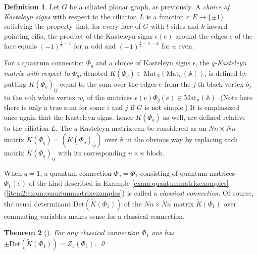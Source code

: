 \documentclass[12pt, reqno]{amsart}
\newtheorem{theo}{Theorem}[section]
\theoremstyle{definition}
\newtheorem{defi}[theo]{Definition}
\renewcommand{\tilde}{\widetilde}
\newcommand{\Det}{\mathrm{Det}}%
\newcommand{\Mat}{\mathrm{Mat}}%
\begin{document}
\begin{defi}
Let $G$ be a ciliated planar graph, as previously.  A \emph{choice of Kasteleyn signs} with respect to the ciliation $L$ is a function $\epsilon:E\to\{\pm1\}$ satisfying the property that, for every face of $G$ with $l$ sides and $k$ inward-pointing cilia, the product of the Kasteleyn signs $\epsilon(e)$ around the edges $e$ of the face equals $(-1)^{\frac{l}{2}-1}$ for $n$ odd and $(-1)^{\frac{l}{2}-1-k}$ for $n$ even.  

For a quantum connection $\Phi_q$ and a choice of Kasteleyn signs $\epsilon$, the \emph{$q$-Kasteleyn matrix with respect to $\Phi_q$}, denoted $K(\Phi_q)\in \Mat_N(\Mat_n(\mathbb{A}))$, is defined by putting $K(\Phi_q)_{ij}$ equal to the sum over the edges $e$ from the $j$-th black vertex $b_j$ to the $i$-th white vertex $w_i$ of the matrices $\epsilon(e)\Phi_q(e)\in \Mat_n(\mathbb{A})$.  (Note here there is only a true sum for some $i$ and $j$ if $G$ is not simple.)  It is emphasized once again that the Kasteleyn signs, hence $K(\Phi_q)$ as well, are defined relative to the ciliation $L$.  The $q$-Kasteleyn matrix can be considered as an $Nn\times Nn$ matrix $\tilde{K}(\Phi_q)=(\tilde{K}(\Phi_q)_{\tilde{i}\tilde{j}})$ over $\mathbb{A}$ in the obvious way by replacing each matrix $K(\Phi_q)_{ij}$ with its corresponding $n\times n$ block.  

When $q=1$, a quantum connection $\Phi_q=\Phi_1$ consisting of quantum matrices $\Phi_1(e)$ of the kind described in Example \ref{exam:quantummatrixexamples} (\ref{item2:exam:quantummatrixexamples}) is called a \emph{classical connection}.  Of course, the usual determinant $\Det(\tilde{K}(\Phi_1))$ of the $Nn\times Nn$ matrix $\tilde{K}(\Phi_1)$ over commuting variables makes sense for a classical connection.  
\end{defi}

\begin{theo}[\cite{DKS, KenyonOvenhouse}]\label{theo:classicalkasteleyntheorem}
For any classical connection $\Phi_1$ one has $\pm \Det(\tilde{K}(\Phi_1))=Z_1(\Phi_1)$.  
\qed\end{theo}
\end{document}
